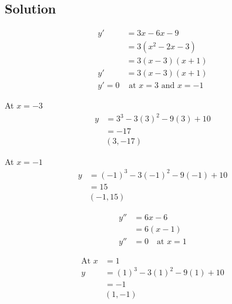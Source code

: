 \documentclass{article}
\begin{document}
\subsection*{Solution}
\begin{align*}
    y' &= 3x - 6x - 9 \\
    &= 3(x^2 - 2x - 3) \\
    &= 3(x - 3)(x + 1) \\
    y' &= 3(x - 3)(x + 1) \\
    y' = 0 & \text{ at } x = 3 \text{ and } x = -1
\end{align*}
\begin{minipage}{0.5\linewidth}
At $x=-3$ 
\begin{align*}
    y&=3^3-3(3)^2-9(3)+10\\
    &=-17\\
    &(3,-17)
\end{align*}
\end{minipage}
\begin{minipage}{0.5\linewidth}
At $x=-1$ 
\begin{align*}
    y&=(-1)^3-3(-1)^2-9(-1)+10\\
    &=15\\
    &(-1,15)
\end{align*}
\end{minipage}
\begin{minipage}{0.5\linewidth}
\begin{align*}
    y'' &= 6x - 6 \\
    &= 6(x - 1) \\
    y'' &= 0 \quad \text{at } x = 1
\end{align*}
\end{minipage}
\begin{minipage}{0.5\linewidth}
\begin{align*}
\text{At } x &= 1 \\
y &= (1)^3 - 3(1)^2 - 9(1) + 10 \\
&= -1 \\
&(1, -1)
\end{align*}
\end{minipage}
\end{document}
